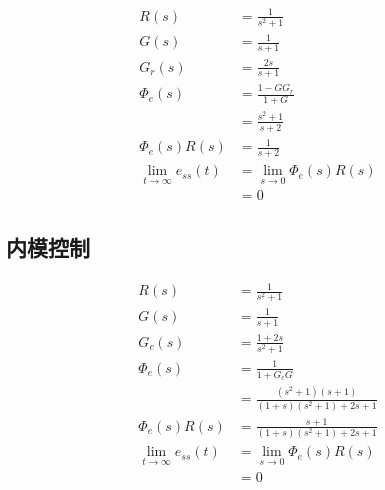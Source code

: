 \documentclass{article}
\begin{document}
\begin{align*}
R(s) &=\frac{1}{s^2+1}\\
G(s) &=\frac{1}{s+1}\\
G_r(s) &= \frac{2s}{s+1} \\
\Phi_e(s) &=\frac{1-G G_r}{1+G}\\
&= \frac{s^2+1}{s+2}\\
\Phi_e(s)R(s) &=\frac{1}{s+2}\\
\lim_{t\to\infty}e_{ss}(t) &=\lim_{s\to 0}\Phi_e(s)R(s)\\
 &=0
\end{align*}
\subsection{内模控制}
\label{sec-5-2}

\begin{align*}
R(s) &=\frac{1}{s^2+1}\\
G(s) &=\frac{1}{s+1}\\
G_c(s) &= \frac{1+2s}{s^2+1} \\
\Phi_e(s) &=\frac{1}{1+G_c G}\\
&= \frac{(s^2+1)(s+1)}{(1+s)(s^2+1)+2s+1}\\
\Phi_e(s)R(s) &=\frac{s+1}{(1+s)(s^2+1)+2s+1}\\
\lim_{t\to\infty}e_{ss}(t) &=\lim_{s\to 0}\Phi_e(s)R(s)\\
 &=0
\end{align*}
\end{document}
